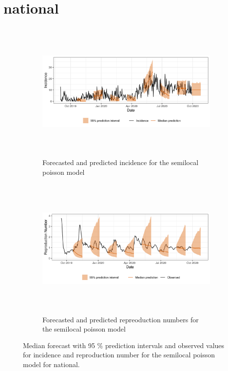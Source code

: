  \section{ national }\begin{figure}[H]\begin{subfigure}{\textwidth}  \centering  \includegraphics[width=0.9\linewidth, height=7cm]{../output/national_predictions.png}  \caption{Forecasted and predicted incidence for the semilocal poisson model}\end{subfigure}

\begin{subfigure}{\textwidth}  \centering  \includegraphics[width=0.9\linewidth, height=7cm]{../output/national_Rs.png}  \caption{Forecasted and predicted repreoduction numbers for the semilocal poisson model}\end{subfigure}  \caption{Median forecast with 95 \% prediction intervals and observed values for incidence and reproduction number for the semilocal poisson model for national.}\end{figure}

